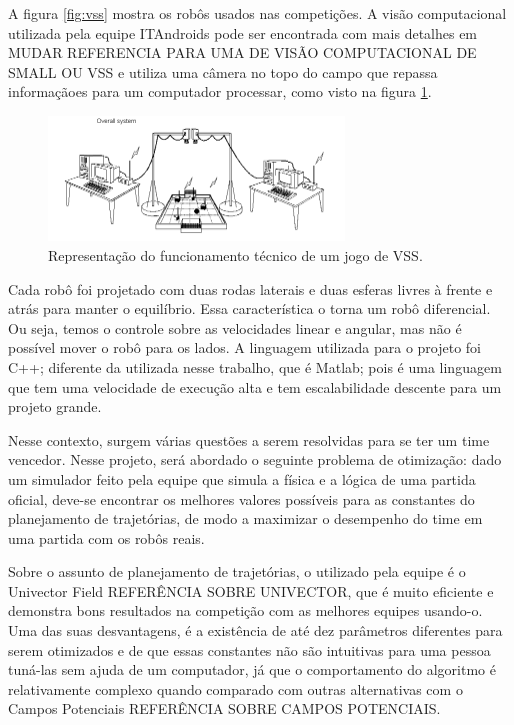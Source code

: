 \documentclass[a4paper,12pt]{article}
\begin{document}
A figura \ref{fig:vss} mostra os robôs usados nas competições. A visão computacional utilizada pela equipe ITAndroids pode ser encontrada com mais detalhes em \cite{tasinaffo_ic} MUDAR REFERENCIA PARA UMA DE VISÃO COMPUTACIONAL DE SMALL OU VSS e utiliza uma câmera no topo do campo que repassa informaçãoes para um computador processar, como visto na figura \ref{fig:funcioamento}.

\begin{figure}[H]
	\centering
		\includegraphics[width=0.7\textwidth]{figures/overview.png}
  \caption{Representação do funcionamento técnico de um jogo de VSS.}
	\label{fig:funcioamento}
\end{figure}

Cada robô foi projetado com duas rodas laterais e duas esferas livres à frente e atrás para manter o equilíbrio. Essa característica o torna um robô diferencial. Ou seja, temos o controle sobre as velocidades linear e angular, mas não é possível mover o robô para os lados. A linguagem utilizada para o projeto foi C++; diferente da utilizada nesse trabalho, que é Matlab; pois é uma linguagem que tem uma velocidade de execução alta e tem escalabilidade descente para um projeto grande. 

Nesse contexto, surgem várias questões a serem resolvidas para se ter um time vencedor. Nesse projeto, será abordado o seguinte problema de otimização: dado um simulador feito pela equipe que simula a física e a lógica de uma partida oficial, deve-se encontrar os melhores valores possíveis para as constantes do planejamento de trajetórias, de modo a maximizar o desempenho do time em uma partida com os robôs reais.

Sobre o assunto de planejamento de trajetórias, o utilizado pela equipe é o Univector Field REFERÊNCIA SOBRE UNIVECTOR, que é muito eficiente e demonstra bons resultados na competição com as melhores equipes usando-o. Uma das suas desvantagens, é a existência de até dez parâmetros diferentes para serem otimizados e de que essas constantes não são intuitivas para uma pessoa tuná-las sem ajuda de um computador, já que o comportamento do algoritmo é relativamente complexo quando comparado com outras alternativas com o Campos Potenciais REFERÊNCIA SOBRE CAMPOS POTENCIAIS.
\end{document}
